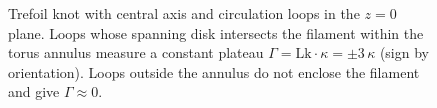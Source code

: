 \documentclass[11pt]{article}
\begin{document}
\begin{figure}[t]
\caption{Trefoil knot with central axis and circulation loops in the $z{=}0$ plane.
Loops whose spanning disk intersects the filament within the torus annulus measure a constant plateau $\Gamma=\mathrm{Lk}\cdot\kappa=\pm 3\,\kappa$ (sign by orientation).
Loops outside the annulus do not enclose the filament and give $\Gamma\approx 0$.}
\label{fig:trefoil_axis_plateau}
\end{figure}

\end{document}
